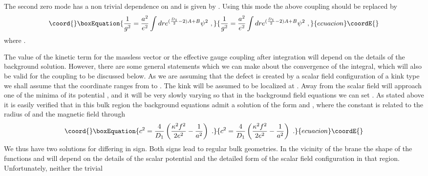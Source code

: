 \documentclass[a4paper,12pt]{article}
\begin{document}
The second zero mode has a non trivial dependence on \coordHE{} and is
given by \coordHE{}.
Using this mode the above coupling should be replaced by
\begin{equation}\coord{}\boxEquation{
\frac{1}{g^2}=\frac{a^2}{e^2}\int dr e^{(\frac{D_1}{2}-2)A+B}\psi^2~,
}{
\frac{1}{g^2}=\frac{a^2}{e^2}\int dr e^{(\frac{D_1}{2}-2)A+B}\psi^2~,
}{ecuacion}\coordE{}\end{equation}
where \coordHE{}.

The value of the kinetic term for the massless vector or the
effective gauge coupling after \coordHE{} integration will depend on the
details of the background solution. However, there are some general
statements which we can make about the convergence of the integral,
which will also be valid for the \coordHE{} coupling to be discussed
below. As we are assuming that the defect is created by a scalar
field configuration of a kink type we shall assume that the
coordinate \coordHE{} ranges from \myHighlight{$-\infty$}\coordHE{} to \myHighlight{$+\infty$}\coordHE{}. The kink will be
assumed to be localized at \coordHE{}. Away from \coordHE{} the scalar field
will approach one of the minima of its potential \coordHE{}, and it
will be very slowly varying so that in the background field equations
we can set \coordHE{}. As stated above it is easily verified that in
this bulk region the background equations admit a solution of the
form \coordHE{} and \coordHE{}, where the constant \coordHE{} is related to the
radius of \coordHE{} and the magnetic field \coordHE{} through
\begin{equation}\coord{}\boxEquation{
 c^2 = \frac{4}{D_1} \left(\frac{\kappa^2 f^2}{2e^2}-
\frac{1}{a^2}\right)~.
}{
 c^2 = \frac{4}{D_1} \left(\frac{\kappa^2 f^2}{2e^2}-
\frac{1}{a^2}\right)~.
}{ecuacion}\coordE{}\end{equation}
We thus have two solutions for \coordHE{} differing in sign. Both signs lead
to regular bulk geometries. In the vicinity of the brane the shape of
the functions \coordHE{} and \coordHE{} will depend on the details of the
scalar potential and the detailed form of the scalar field
configuration in that region. Unfortunately, neither the trivial
\end{document}
